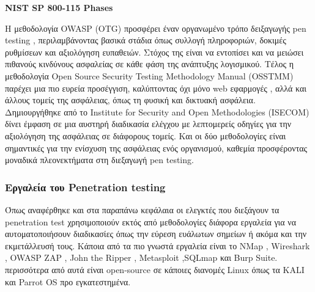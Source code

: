 \begin{center}
    \textbf{\lt NIST SP 800-115 Phases}
\end{center}


Η μεθοδολογία \lt OWASP (OTG) \gt προσφέρει έναν οργανωμένο τρόπο δειξαγωγής \lt pen testing \gt, περιλαμβάνοντας βασικά στάδια όπως  συλλογή πληροφοριών, δοκιμές ρυθμίσεων και  αξιολόγηση ευπαθειών. Στόχος της είναι να εντοπίσει και να μειώσει πιθανούς κινδύνους ασφαλείας σε κάθε φάση της ανάπτυξης λογισμικού. Τέλος η μεθοδολογία \lt Open Source Security Testing Methodology Manual (OSSTMM) \gt παρέχει μια πιο ευρεία προσέγγιση, καλύπτοντας όχι μόνο web εφαρμογές , αλλά και άλλους τομείς της ασφάλειας, όπως τη φυσική και δικτυακή ασφάλεια. Δημιουργήθηκε από το \lt Institute for Security and Open Methodologies (ISECOM)  δίνει έμφαση σε μια αυστηρή διαδικασία ελέγχου με λεπτομερείς οδηγίες για την αξιολόγηση της ασφάλειας σε διάφορους τομείς. Και οι δύο μεθοδολογίες είναι σημαντικές για την ενίσχυση της ασφάλειας ενός οργανισμού, καθεμία προσφέροντας μοναδικά πλεονεκτήματα στη διεξαγωγή \lt pen testing.
\subsubsection{\gt Εργαλεία του \lt Penetration testing}

\hspace*{2em}Όπως αναφέρθηκε και στα παραπάνω κεφάλαια οι ελεγκτές που διεξάγουν τα \lt penetration test \gt χρησιμοποιούν εκτός από μεθοδολογίες διάφορα εργαλεία για να αυτοματοποιήσουν διαδικασίες όπως την εύρεση ευάλωτων σημείων ή ακόμα και την εκμετάλλευσή τους. Κάποια από τα πιο γνωστά εργαλεία είναι το \lt NMap ,  Wireshark , OWASP ZAP , John the Ripper , Metasploit ,SQLmap \gt και \lt Burp Suite.  περισσότερα από αυτά είναι \lt open-source  σε κάποιες διανομές \lt Linux \gt όπως τα \lt KALI \gt και \lt Parrot OS  προ εγκατεστημένα.


